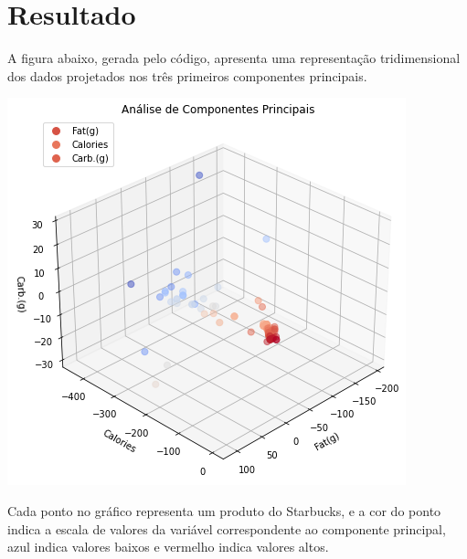 \documentclass[12pt,a4]{article}
\begin{document}
\section{Resultado}
A figura abaixo, gerada pelo código, apresenta uma representação tridimensional dos dados projetados nos três primeiros componentes principais.
\begin{center}
    \includegraphics[scale=0.9]{1.png}
\end{center}
\begin{flushleft}
Cada ponto no gráfico representa um produto do Starbucks, e a cor do ponto indica a escala de valores da variável correspondente ao componente principal, azul indica valores baixos e vermelho indica valores altos.
\end{flushleft}
\end{document}
